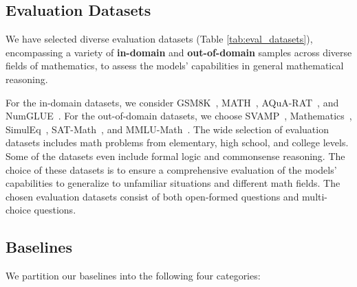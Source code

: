 \subsection{Evaluation Datasets} We have selected diverse evaluation datasets (Table \ref{tab:eval_datasets}), encompassing a variety of \textbf{in-domain} and \textbf{out-of-domain} samples across diverse fields of mathematics, to assess the models' capabilities in general mathematical reasoning. 

For the in-domain datasets, we consider GSM8K~\citep{cobbe2021training}, MATH~\citep{hendrycks2021measuring}, AQuA-RAT~\citep{ling2017program}, and NumGLUE~\citep{mishra2022numglue}. For the out-of-domain datasets, we choose SVAMP~\citep{patel2021nlp}, Mathematics~\citep{davies2021advancing}, SimulEq~\citep{koncel2016mawps}, SAT-Math~\citep{zhong2023agieval}, and MMLU-Math~\citep{hendrycks2020measuring}. The wide selection of evaluation datasets includes math problems from elementary, high school, and college levels. Some of the datasets even include formal logic and commonsense reasoning. The choice of these datasets is to ensure a comprehensive evaluation of the models' capabilities to generalize to unfamiliar situations and different math fields. The chosen evaluation datasets consist of both open-formed questions and multi-choice questions. 

\subsection{Baselines}
We partition our baselines into  the following four categories:

